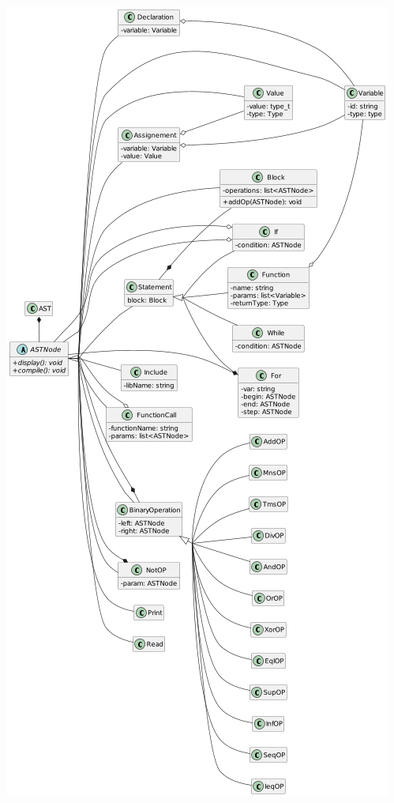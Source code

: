 \documentclass[a4paper]{article}%
\begin{document}
\begin{center}
\includegraphics[scale=0.65]{../ressources/diagrams/ast.png}
\end{center}
\end{document}

